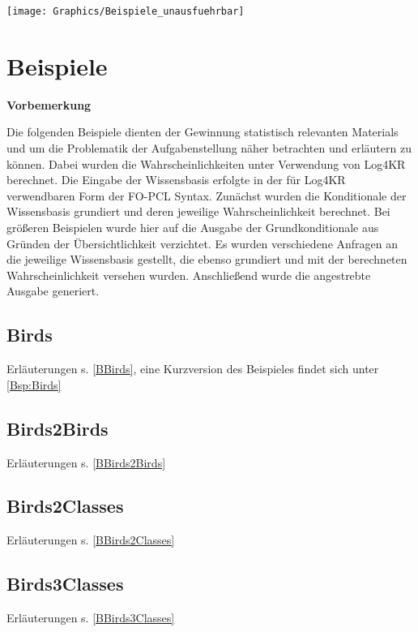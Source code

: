 \documentclass[a4paper, 11pt]{book}
\begin{document}
{\texttt{[image: Graphics/Beispiele\_unausfuehrbar]}
\begin{figure}[h]
	
\end{figure}




\chapter{Beispiele}
\label{examples}

\textbf{Vorbemerkung}

\noindent
Die folgenden Beispiele dienten der Gewinnung statistisch relevanten Materials und um die Problematik der Aufgabenstellung näher betrachten und erläutern zu können. Dabei wurden die Wahrscheinlichkeiten unter Verwendung von Log4KR berechnet. Die Eingabe der Wissensbasis erfolgte in der für Log4KR verwendbaren Form der FO-PCL Syntax. Zunächst wurden die Konditionale der Wissensbasis grundiert und deren jeweilige Wahrscheinlichkeit berechnet. Bei größeren Beispielen wurde hier auf die Ausgabe der Grundkonditionale aus Gründen der Übersichtlichkeit verzichtet.
Es wurden verschiedene Anfragen an die jeweilige Wissensbasis gestellt, die ebenso grundiert und mit der berechneten Wahrscheinlichkeit versehen wurden.
Anschließend wurde die angestrebte Ausgabe  generiert. 

\section{Birds} Erläuterungen s. \ref{BBirds}, eine Kurzversion des Beispieles findet sich unter \ref{Bsp:Birds}
\label{Birds}

\newpage

\section{Birds2Birds} Erläuterungen s. \ref{BBirds2Birds}
\label{Birds2Birds}

\newpage

\section{Birds2Classes} Erläuterungen s. \ref{BBirds2Classes}
\label{Birds2Classes}

\newpage

\section{Birds3Classes} Erläuterungen s. \ref{BBirds3Classes}
\label{Birds3Classes}

\newpage

}
\end{document}
